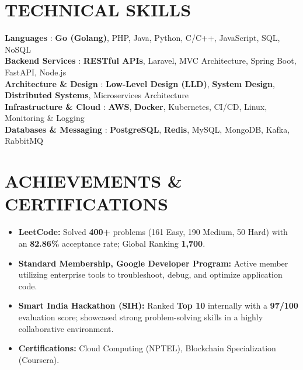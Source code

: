 \documentclass[letterpaper,11pt]{article}
\newcommand{\resumeItem}[1]{\item\small{{#1 \vspace{-1pt}}}}
\newcommand{\resumeItemListStart}{\begin{itemize}}
\newcommand{\resumeItemListEnd}{\end{itemize}\vspace{0pt}}
\begin{document}
\section{TECHNICAL SKILLS}
 \begin{itemize}[leftmargin=0in, label={}]
    \small{\item{
     \textbf{Languages} {: \textbf{Go (Golang)}, PHP, Java, Python, C/C++, JavaScript, SQL, NoSQL}\vspace{2pt} \\
     \textbf{Backend Services} {: \textbf{RESTful APIs}, Laravel, MVC Architecture, Spring Boot, FastAPI, Node.js}\vspace{2pt} \\
     \textbf{Architecture \& Design} {: \textbf{Low-Level Design (LLD)}, \textbf{System Design}, \textbf{Distributed Systems}, Microservices Architecture}\vspace{2pt} \\
     \textbf{Infrastructure \& Cloud} {: \textbf{AWS}, \textbf{Docker}, Kubernetes, CI/CD, Linux, Monitoring \& Logging}\vspace{2pt} \\
     \textbf{Databases \& Messaging} {: \textbf{PostgreSQL}, \textbf{Redis}, MySQL, MongoDB, Kafka, RabbitMQ}
    }}
 \end{itemize}

\section{ACHIEVEMENTS \& CERTIFICATIONS}
    \resumeItemListStart
        \resumeItem{\textbf{LeetCode:} Solved \textbf{400+} problems (161 Easy, 190 Medium, 50 Hard) with an \textbf{82.86\%} acceptance rate; Global Ranking \textbf{1,700}.}
        \resumeItem{\textbf{Standard Membership, Google Developer Program:} Active member utilizing enterprise tools to troubleshoot, debug, and optimize application code.}
        \resumeItem{\textbf{Smart India Hackathon (SIH):} Ranked \textbf{Top 10} internally with a \textbf{97/100} evaluation score; showcased strong problem-solving skills in a highly collaborative environment.}
        \resumeItem{\textbf{Certifications:} Cloud Computing (NPTEL), Blockchain Specialization (Coursera).}
    \resumeItemListEnd
\end{document}
